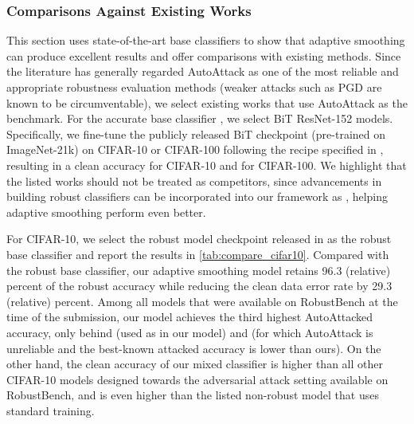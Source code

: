 \documentclass[11pt, letterpaper]{article}
\theoremstyle{plain}
\theoremstyle{definition}
\begin{document}
\subsubsection{Comparisons Against Existing Works} \label{sec:adap_exp_compare}

This section uses state-of-the-art base classifiers to show that adaptive smoothing can produce excellent results and offer comparisons with existing methods. Since the literature has generally regarded AutoAttack \citep{Croce20a} as one of the most reliable and appropriate robustness evaluation methods (weaker attacks such as PGD are known to be circumventable), we select existing works that use AutoAttack as the benchmark. For the accurate base classifier , we select BiT \citep{Kolesnikov20} ResNet-152 models. Specifically, we fine-tune the publicly released BiT checkpoint (pre-trained on ImageNet-21k) on CIFAR-10 or CIFAR-100 following the recipe specified in \citep{Kolesnikov20}, resulting in a  clean accuracy for CIFAR-10 and  for CIFAR-100. We highlight that the listed works should not be treated as competitors, since advancements in building robust classifiers can be incorporated into our framework as , helping adaptive smoothing perform even better.

For CIFAR-10, we select the robust model checkpoint released in \citep{Wang23} as the robust base classifier  and report the results in \cref{tab:compare_cifar10}. Compared with the robust base classifier, our adaptive smoothing model retains 96.3 (relative) percent of the robust accuracy while reducing the clean data error rate by 29.3 (relative) percent. Among all models that were available on RobustBench at the time of the submission, our model achieves the third highest AutoAttacked accuracy, only behind \citep{Wang23} (used as  in our model) and \citep{Kang21} (for which AutoAttack is unreliable and the best-known attacked accuracy is lower than ours). On the other hand, the clean accuracy of our mixed classifier is higher than all other CIFAR-10 models designed towards the  adversarial attack setting available on RobustBench, and is even higher than the listed non-robust model that uses standard training.
\end{document}
